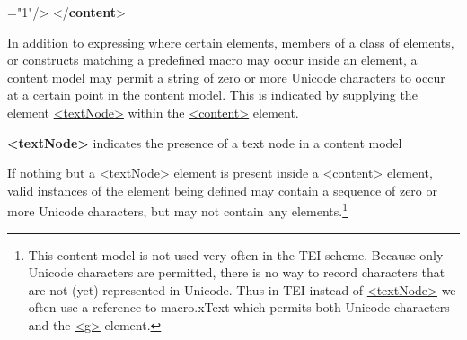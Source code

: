 \begin{shaded}
{\hspace*{1em}\hspace*{1em}\hspace*{1em}\hspace*{1em}{maxOccurs}="{1}"/>}\mbox{}\newline 
\hspace*{1em}\mbox{}\newline 
\hspace*{1em}\mbox{}\newline 
{}\mbox{}\newline 
{</\textbf{content}>}\end{shaded}\egroup\par \par
In addition to expressing where certain elements, members of a class of elements, or constructs matching a predefined macro may occur inside an element, a content model may permit a string of zero or more Unicode characters to occur at a certain point in the content model. This is indicated by supplying the element \hyperref[TEI.textNode]{<textNode>} within the \hyperref[TEI.content]{<content>} element. 
\begin{sansreflist}
  
\item [\textbf{<textNode>}] indicates the presence of a text node in a content model
\end{sansreflist}
 If nothing but a \hyperref[TEI.textNode]{<textNode>} element is present inside a \hyperref[TEI.content]{<content>} element, valid instances of the element being defined may contain a sequence of zero or more Unicode characters, but may not contain any elements.\footnote{This content model is not used very often in the TEI scheme. Because only Unicode characters are permitted, there is no way to record characters that are not (yet) represented in Unicode. Thus in TEI instead of \hyperref[TEI.textNode]{<textNode>} we often use a reference to \textsf{macro.xText} which permits both Unicode characters and the \hyperref[TEI.g]{<g>} element.}

